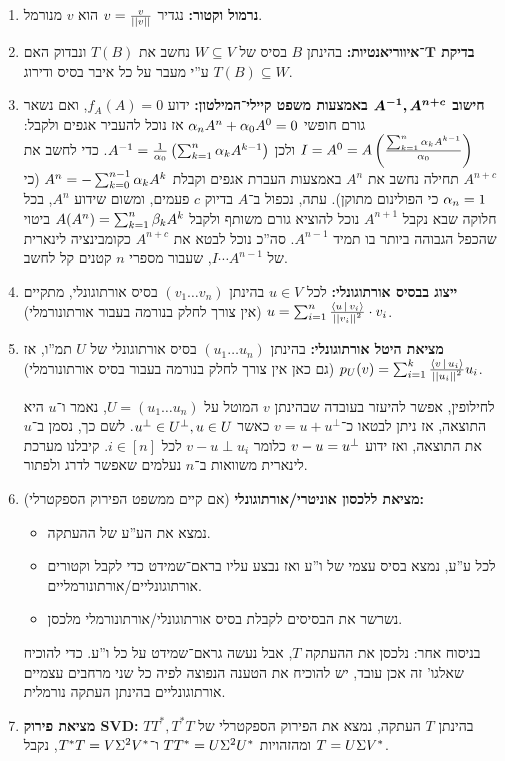 \documentclass[name=רשימות אלגברה לינארית 2א]{../../../tex/classes/megasumPreamble}
\begin{document}
\begin{enumerate}[A']
		\item \textbf{נרמול וקטור: }נגדיר $v = \frac{v}{\left \vert \left \vert v \right \vert \right \vert}$ הוא $v$ מנורמל. 
		\item \textbf{בדיקת $\bm{T}$־איווריאנטיות: }בהינתן $B$ בסיס של $W \subseteq V$ נחשב את $T(B)$ ונבדוק האם $T(B) \subseteq W$ ע''י מעבר על כל איבר בסיס ודירוג. 
		\item \textbf{חישוב $\bm{A^{-1}, A^{n + c}}$ באמצעות משפט קיילי־המילטון: }ידוע $f_A(A) = 0$, ואם נשאר גורם חופשי $\alpha_nA^{n} + \alpha_0 A^{0} = 0$ אז נוכל להעביר אגפים ולקבל: $I = A^0 = A\left ( \frac{\sum_{k = 1}^{n}\alpha_kA^{k - 1}}{\alpha_0} \right )$ ולכן $A^{-1} = \frac{1}{\alpha_0}\left ( \sum_{k = 1}^{n} \alpha_k A^{k - 1} \right )$. כדי לחשב את $A^{n + c}$ תחילה נחשב את $A^{n}$ באמצעות העברת אגפים וקבלת $A^{n} = -\sum_{k = 0}^{n - 1} \alpha_kA^{k}$ (כי $\alpha_n = 1$ כי הפולינום מתוקן). עתה, נכפול ב־$A$ בדיוק $c$ פעמים, ומשום שידוע $A^{n}$, בכל חלוקה שבא נקבל $A^{n + 1}$ נוכל להוציא גורם משותף ולקבל $A(A^{n}) = \sum_{k = 1}^{n} \beta_kA^{k}$ ביטוי שהכפל הגבוהה ביותר בו תמיד $A^{n - 1}$. סה''כ נוכל לבטא את $A^{n + c}$ כקומבינציה לינארית של $I \cdots A^{n - 1}$, שעבור מספרי $n$ קטנים קל לחשב. 
		\item \textbf{ייצוג בבסיס אורתוגונלי: }לכל $u \in V$ בהינתן $(v_1 \dots v_n)$ בסיס אורתוגונלי, מתקיים $u = \sum_{i = 1}^{n} \frac{\left \langle u \,\middle|\, v_i \right \rangle}{\left \vert \left \vert v_i \right \vert \right \vert^{2}} \cdot v_i$ (אין צורך לחלק בנורמה בעבור אורתונורמלי). 
		\item \textbf{מציאת היטל אורתוגונלי: }בהינתן $(u_1 \dots u_n)$ בסיס אורתוגונלי של $U$ תמ''ו, אז $p_U(v) = \sum_{i = 1}^{k}\frac{\left \langle v \,\middle|\, u_i \right \rangle}{\left \vert \left \vert u_i \right \vert \right \vert^2}u_i$ (גם כאן אין צורך לחלק בנורמה בעבור בסיס אורתונורמלי). 
		
		לחילופין, אפשר להיעזר בעובדה שבהינתן $v$ המוטל על $U = (u_1 \dots u_n)$, נאמר ו־$u$ היא התוצאה, אז ניתן לבטאו כ־$v = u + u^{\perp}$ כאשר $u^{\perp} \in U^{\perp}, u \in U$. לשם כך, נסמן ב־$u$ את התוצאה, ואז ידוע $v - u = u^{\perp}$ כלומר $v - u \perp u_i$ לכל $i \in [n]$. קיבלנו מערכת לינארית משוואות ב־$n$ נעלמים שאפשר לדרג ולפתור. 
		\item \textbf{מציאת ללכסון אוניטרי/אורתוגונלי} (אם קיים ממשפט הפירוק הספקטרלי)\textbf{: }
		\begin{itemize}
			\item נמצא את הע''ע של ההעתקה. 
			\item לכל ע''ע, נמצא בסיס עצמי של ו''ע ואז נבצע עליו בראם־שמידט כדי לקבל וקטורים אורתוגונליים/אורתונורמליים. 
			\item נשרשר את הבסיסים לקבלת בסיס אורתוגונלי/אורתונורמלי מלכסן. 
		\end{itemize}
		בניסוח אחר: נלכסן את ההעתקה $T$, אבל נעשה גראם־שמידט על כל ו''ע. כדי להוכיח שאלגו' זה אכן עובד, יש להוכיח את הטענה הנפוצה לפיה כל שני מרחבים עצמיים אורתוגונליים בהינתן העתקה נורמלית. 
		\item \textbf{מציאת פירוק SVD: }בהינתן $T$ העתקה, נמצא את הפירוק הספקטרלי של $TT^*, T^*T$ ומהזהויות		 $TT^* = U\Sigma^2U^{*}$ ו־$T^*T = V\Sigma^2 V^{*}$, נקבל $T = U\Sigma V^{*}$. 
	\end{enumerate}
	
\end{document}

